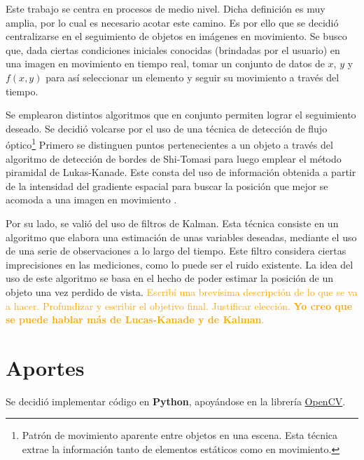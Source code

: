Este trabajo se centra en procesos de medio nivel. Dicha definición es muy amplia, por lo cual es necesario acotar este camino. Es por ello que se decidió centralizarse en el seguimiento de objetos en imágenes en movimiento. Se busco que, dada ciertas condiciones iniciales conocidas (brindadas por el usuario) en una imagen en movimiento en tiempo real, tomar un conjunto de datos de $x$, $y$ y $f(x,y)$ para así seleccionar un elemento y seguir su movimiento a través del tiempo. 

Se emplearon distintos algoritmos que en conjunto permiten lograr el seguimiento deseado. Se decidió volcarse por el uso de una técnica de detección de flujo óptico\footnote{Patrón de movimiento aparente entre objetos en una escena. Esta técnica extrae la información tanto de elementos estáticos como en movimiento\cite{ref:optic-flow}.}%
Primero se distinguen puntos pertenecientes a un objeto a través del algoritmo de detección de bordes de Shi-Tomasi para luego emplear el método piramidal de Lukas-Kanade. Este consta del uso de información obtenida a partir de la intensidad del gradiente espacial para buscar la posición que mejor se acomoda a una imagen en movimiento \cite{ref:lucas-kanade} \cite{ref:lucas-kanade2}.

Por su lado, se valió del uso de filtros de Kalman. Esta técnica consiste en un algoritmo que elabora una estimación de unas variables deseadas, mediante el uso de una serie de observaciones a lo largo del tiempo. Este filtro considera ciertas imprecisiones en las mediciones, como lo puede ser el ruido existente. La idea del uso de este algoritmo se basa en el hecho de poder estimar la posición de un objeto una vez perdido de vista.
\textcolor{orange}{Escribí una brevísima descripción de lo que se va a hacer. Profundizar y escribir el objetivo final. Justificar elección. \textbf{Yo creo que se puede hablar más de Lucas-Kanade y de Kalman}.}

\section{Aportes}
Se decidió implementar código en \textbf{Python}, apoyándose en la librería \href{https://opencv.org/}{OpenCV}.

